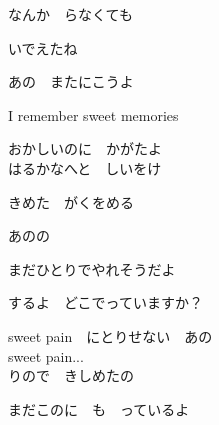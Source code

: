 {なんか　らなくても

いでえたね

あの　またにこうよ

I remember sweet memories

おかしいのに　かがたよ
\\

はるかなへと　しいをけ

きめた　がくをめる

あのの

まだひとりでやれそうだよ

するよ　どこでっていますか？

sweet pain　にとりせない　あの
\\

sweet pain...
\\

りので　きしめたの

まだこのに　も　っているよ

}